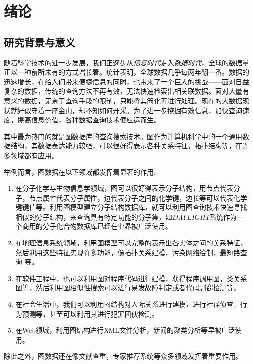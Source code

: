 \documentclass{XDBAthesis}
\begin{document}
\else
\fi
\chapter{绪论}
\label{chap:introduction}
\section{研究背景与意义}
随着科学技术的进一步发展，我们正逐步从\emph{信息时代}走入\emph{数据时代}\cite{BigData}，全球的数据量正以一种前所未有的方式增长着。统计表明，全球数据几乎每两年翻一番\cite{dataincrease}。数据的迅速增长，在给人们带来便捷信息的同时，也带来了一个巨大的挑战——面对日益复杂的数据，传统的查询方法不再有效，无法快速检索出相关联数据。面对大量有意义的数据，无奈于查询手段的限制，只能将其简化再进行处理。现在的大数据现状就好似守着一座金山，却不知如何开采。为了进一步挖掘有效信息，加快查询速度，提高信息价值，各种数据查询技术便应运而生。

其中最为热门的就是图数据库的查询搜索技术。图作为计算机科学中的一个通用数据结构\cite{dataincrease}，其数据表达能力较强，可以很好得表示各种关系特征，拓扑结构等，在许多领域都有应用。

举例而言，图数据在以下领域都发挥着显著的作用:
\begin{enumerate}
    \item 在分子化学\cite{yp}与生物信息学\cite{yy}领域，图可以很好得表示分子结构，用节点代表分子，节点属性代表分子属性，边代表分子之间的化学键，边长等可以代表化学键键值等。利用图模型建立分子结构数据库，就可以利用图查询技术快速寻找相似的分子结构，来查询具有特定功能的分子集，如$DAYLIGHT$系统\cite{daylight}作为一个商用的分子化合物数据库已经在业界被广泛使用。
    \item 在地理信息系统领域\cite{y6,y7,y8}，利用图模型可以完整的表示出各实体之间的关系特征，然后利用这些特征实现许多功能，像拓扑关系建模，污染网络绘制，最短路查询\cite{y8} 等。
    \item 在软件工程中，也可以利用图对程序代码进行建模，获得程序调用图，类关系图等，然后利用图相似性搜索可以进行易发故障判定或者代码剽窃检测\cite{copy}等。
    \item 在社会生活中，我们可以利用图结构对人际关系进行建模，进行社群侦查，行为预测等，甚至可以利用其进行犯罪团伙检测\cite{y10}。
    \item 在Web领域，利用图结构进行XML文件分析，新闻的聚类分析等早被广泛使用。
\end{enumerate}

除此之外，图数据还在像文献查重\cite{y9}，专家推荐系统等众多领域发挥着重要作用。
\end{document}
